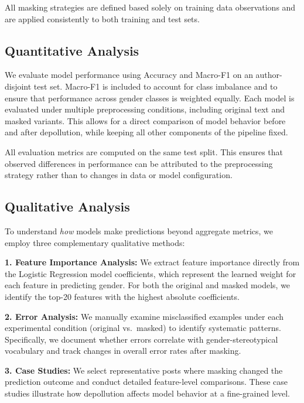 \documentclass[11pt]{article}
\begin{document}
All masking strategies are defined based solely on training data observations
and are applied consistently to both training and test sets.

\subsection{Quantitative Analysis}
We evaluate model performance using Accuracy and Macro-F1 on an author-disjoint
test set. Macro-F1 is included to account for class imbalance and to ensure that
performance across gender classes is weighted equally. Each model is evaluated under multiple preprocessing conditions, including
original text and masked variants. This allows for a direct comparison of model
behavior before and after depollution, while keeping all other components of the
pipeline fixed.

All evaluation metrics are computed on the same test split. This ensures that observed
differences in performance can be attributed to the preprocessing strategy
rather than to changes in data or model configuration.

\subsection{Qualitative Analysis}

To understand \textit{how} models make predictions beyond aggregate metrics, we employ three complementary qualitative methods:

\noindent\textbf{1. Feature Importance Analysis:}  
We extract feature importance directly from the Logistic Regression model coefficients, which represent the learned weight for each feature in predicting gender. For both the original and masked models, we identify the top-20 features with the highest absolute coefficients.  

\noindent\textbf{2. Error Analysis:}  
We manually examine misclassified examples under each experimental condition (original vs.\ masked) to identify systematic patterns. Specifically, we document whether errors correlate with gender-stereotypical vocabulary and track changes in overall error rates after masking.

\noindent\textbf{3. Case Studies:}  
We select representative posts where masking changed the prediction outcome and conduct detailed feature-level comparisons. These case studies illustrate how depollution affects model behavior at a fine-grained level.
\end{document}
